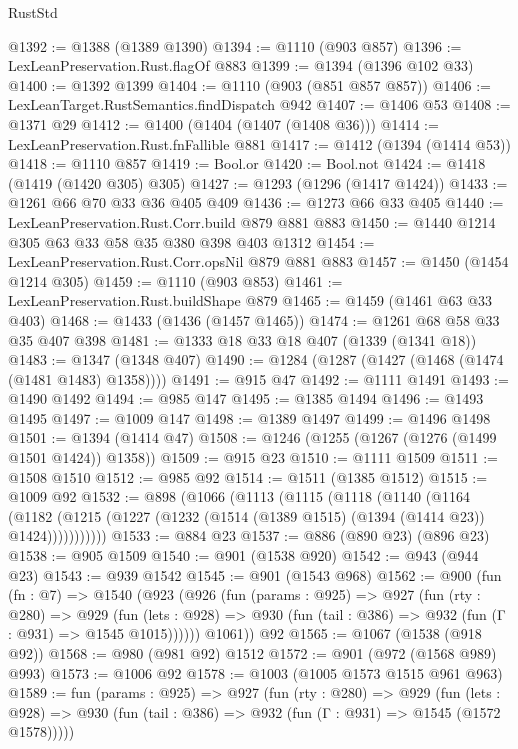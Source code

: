 \begin{lexlean}{RustStd}
\begin{coremodule}
@1392 := @1388 (@1389 @1390)
@1394 := @1110 (@903 @857)
@1396 := LexLeanPreservation.Rust.flagOf @883
@1399 := @1394 (@1396 @102 @33)
@1400 := @1392 @1399
@1404 := @1110 (@903 (@851 @857 @857))
@1406 := LexLeanTarget.RustSemantics.findDispatch @942
@1407 := @1406 @53
@1408 := @1371 @29
@1412 := @1400 (@1404 (@1407 (@1408 @36)))
@1414 := LexLeanPreservation.Rust.fnFallible @881
@1417 := @1412 (@1394 (@1414 @53))
@1418 := @1110 @857
@1419 := Bool.or
@1420 := Bool.not
@1424 := @1418 (@1419 (@1420 @305) @305)
@1427 := @1293 (@1296 (@1417 @1424))
@1433 := @1261 @66 @70 @33 @36 @405 @409
@1436 := @1273 @66 @33 @405
@1440 := LexLeanPreservation.Rust.Corr.build @879 @881 @883
@1450 := @1440 @1214 @305 @63 @33 @58 @35 @380 @398 @403 @1312
@1454 := LexLeanPreservation.Rust.Corr.opsNil @879 @881 @883
@1457 := @1450 (@1454 @1214 @305)
@1459 := @1110 (@903 @853)
@1461 := LexLeanPreservation.Rust.buildShape @879
@1465 := @1459 (@1461 @63 @33 @403)
@1468 := @1433 (@1436 (@1457 @1465))
@1474 := @1261 @68 @58 @33 @35 @407 @398
@1481 := @1333 @18 @33 @18 @407 (@1339 (@1341 @18))
@1483 := @1347 (@1348 @407)
@1490 := @1284 (@1287 (@1427 (@1468 (@1474 (@1481 @1483) @1358))))
@1491 := @915 @47
@1492 := @1111 @1491
@1493 := @1490 @1492
@1494 := @985 @147
@1495 := @1385 @1494
@1496 := @1493 @1495
@1497 := @1009 @147
@1498 := @1389 @1497
@1499 := @1496 @1498
@1501 := @1394 (@1414 @47)
@1508 := @1246 (@1255 (@1267 (@1276 (@1499 @1501 @1424)) @1358))
@1509 := @915 @23
@1510 := @1111 @1509
@1511 := @1508 @1510
@1512 := @985 @92
@1514 := @1511 (@1385 @1512)
@1515 := @1009 @92
@1532 := @898
    (@1066
      (@1113
        (@1115
          (@1118
            (@1140
              (@1164
                (@1182
                  (@1215 (@1227 (@1232 (@1514 (@1389 @1515) (@1394 (@1414 @23)) @1424)))))))))))
@1533 := @884 @23
@1537 := @886 (@890 @23) (@896 @23)
@1538 := @905 @1509
@1540 := @901 (@1538 @920)
@1542 := @943 (@944 @23)
@1543 := @939 @1542
@1545 := @901 (@1543 @968)
@1562 := @900
    (fun (fn : @7) =>
    @1540
      (@923
        (@926
          (fun (params : @925) =>
          @927
            (fun (rty : @280) =>
            @929
              (fun (lets : @928) =>
              @930 (fun (tail : @386) => @932 (fun (Γ : @931) => @1545 @1015))))))
        @1061))
    @92
@1565 := @1067 (@1538 (@918 @92))
@1568 := @980 (@981 @92) @1512
@1572 := @901 (@972 (@1568 @989) @993)
@1573 := @1006 @92
@1578 := @1003 (@1005 @1573 @1515 @961 @963)
@1589 := fun (params : @925) =>
  @927
    (fun (rty : @280) =>
    @929
      (fun (lets : @928) =>
      @930 (fun (tail : @386) => @932 (fun (Γ : @931) => @1545 (@1572 @1578)))))

\end{coremodule}
\end{lexlean}
